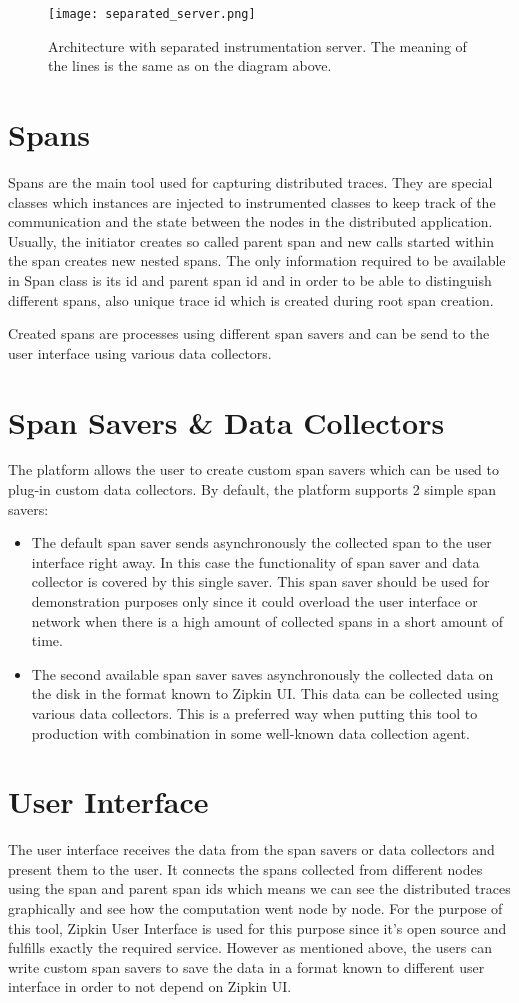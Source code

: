 \begin{figure}
	\centering
	\texttt{[image: separated\_server.png]}
	\caption{Architecture with separated instrumentation server. The meaning of the lines is the same as on the diagram above.}
	\label{fig:separated_server}
\end{figure}

\section{Spans}
Spans are the main tool used for capturing distributed traces. They are special classes which instances are injected to instrumented classes to keep track of the communication and the state between the nodes in the distributed application. Usually, the initiator creates so called parent span and new calls started within the span creates new nested spans. The only information required to be available in Span class is its id and parent span id and in order to be able to distinguish different spans, also unique trace id which is created during root span creation. 

Created spans are processes using different span savers and can be send to the user interface using various data collectors.
\section{Span Savers \& Data Collectors}
The platform allows the user to create custom span savers which can be used to plug-in custom data collectors. By default, the platform supports 2 simple span savers:
\begin{itemize}
	\item The default span saver sends asynchronously the collected span to the user interface right away. In this case the functionality of span saver and data collector is covered by this single saver. This span saver should be used for demonstration purposes only since it could overload the user interface or network when there is a high amount of collected spans in a short amount of time.
	\item The second available span saver saves asynchronously the collected data on the disk in the format known to Zipkin UI. This data can be collected using various data collectors. This is a preferred way when putting this tool to production with combination in some well-known data collection agent.
\end{itemize}
\section{User Interface}
The user interface receives the data from the span savers or data collectors and present them to the user. It connects the spans collected from different nodes using the span and parent span ids which means we can see the distributed traces graphically and see how the computation went node by node. For the purpose of this tool, Zipkin User Interface is used for this purpose since it's open source and fulfills exactly the required service. However as mentioned above, the users can write custom span savers to save the data in a format known to different user interface in order to not depend on Zipkin UI.
